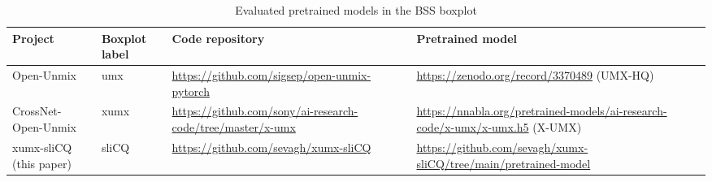 \documentclass[report.tex]{subfiles}
\begin{document}
\begin{table}[ht]
	\centering
	\begin{tabular}{ |l|l|p{4cm}|p{4cm}| }
	 \hline
	  Project & Boxplot label & Code repository & Pretrained model \\
	 \hline
	 \hline
		\makecell[l]{Open-Unmix \\ \textcite{umx}} & umx & \url{https://github.com/sigsep/open-unmix-pytorch} & \url{https://zenodo.org/record/3370489} (UMX-HQ) \\
	 \hline
		\makecell[l]{CrossNet-Open-Unmix \\ \textcite{xumx}} & xumx & \url{https://github.com/sony/ai-research-code/tree/master/x-umx} & \url{https://nnabla.org/pretrained-models/ai-research-code/x-umx/x-umx.h5} (X-UMX) \\
	 \hline
		\makecell[l]{xumx-sliCQ \\ (this paper)} & sliCQ & \url{https://github.com/sevagh/xumx-sliCQ} & \url{https://github.com/sevagh/xumx-sliCQ/tree/main/pretrained-model} \\
	 \hline
\end{tabular}
	\caption{Evaluated pretrained models in the BSS boxplot}
	\label{table:bsseval}
\end{table}
\end{document}
